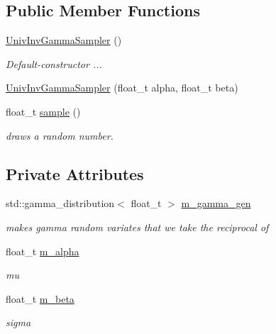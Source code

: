 \subsection*{Public Member Functions}
\begin{DoxyCompactItemize}
\item 
\mbox{\label{classrvsamp_1_1UnivInvGammaSampler_abb7dbe2cde9fd88880a86765b609d5ac}} 
\hyperlink{classrvsamp_1_1UnivInvGammaSampler_abb7dbe2cde9fd88880a86765b609d5ac}{Univ\+Inv\+Gamma\+Sampler} ()
\begin{DoxyCompactList}\small\item\em Default-\/constructor ... \end{DoxyCompactList}\item 
\hyperlink{classrvsamp_1_1UnivInvGammaSampler_a90cc04cdd50c15b4795b4f70dbb9dcb5}{Univ\+Inv\+Gamma\+Sampler} (float\+\_\+t alpha, float\+\_\+t beta)
\item 
float\+\_\+t \hyperlink{classrvsamp_1_1UnivInvGammaSampler_a5d477f520d0a5069c5fcda5a1952cead}{sample} ()
\begin{DoxyCompactList}\small\item\em draws a random number. \end{DoxyCompactList}\end{DoxyCompactItemize}
\subsection*{Private Attributes}
\begin{DoxyCompactItemize}
\item 
\mbox{\label{classrvsamp_1_1UnivInvGammaSampler_ab0ff81a383579c8a6e7f56355270dffe}} 
std\+::gamma\+\_\+distribution$<$ float\+\_\+t $>$ \hyperlink{classrvsamp_1_1UnivInvGammaSampler_ab0ff81a383579c8a6e7f56355270dffe}{m\+\_\+gamma\+\_\+gen}
\begin{DoxyCompactList}\small\item\em makes gamma random variates that we take the reciprocal of \end{DoxyCompactList}\item 
\mbox{\label{classrvsamp_1_1UnivInvGammaSampler_aa60b481c19676ef21c183858a81f27cf}} 
float\+\_\+t \hyperlink{classrvsamp_1_1UnivInvGammaSampler_aa60b481c19676ef21c183858a81f27cf}{m\+\_\+alpha}
\begin{DoxyCompactList}\small\item\em mu \end{DoxyCompactList}\item 
\mbox{\label{classrvsamp_1_1UnivInvGammaSampler_a6f6a37c5adc270be1b83005949d88619}} 
float\+\_\+t \hyperlink{classrvsamp_1_1UnivInvGammaSampler_a6f6a37c5adc270be1b83005949d88619}{m\+\_\+beta}
\begin{DoxyCompactList}\small\item\em sigma \end{DoxyCompactList}\end{DoxyCompactItemize}
